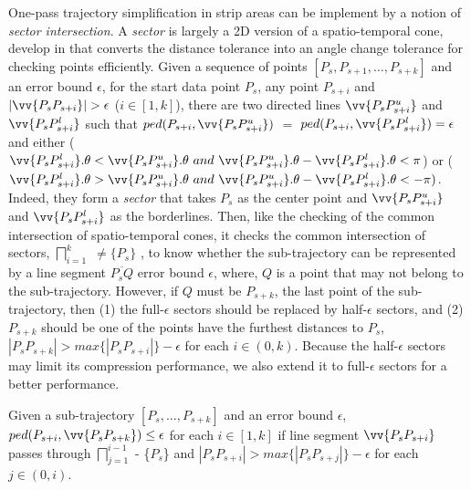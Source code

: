 One-pass trajectory simplification in strip areas can be implement by a notion of \emph{sector intersection}. A \emph{sector} is largely a 2D version of a spatio-temporal cone, develop in \cite{Williams:Longest, Sklansky:Cone, Dunham:Cone, Zhao:Sleeve} that converts the \ped distance tolerance into an angle change tolerance for checking points efficiently.
%
Given a sequence of points $[P_{s}, P_{s+1}, \ldots, P_{s+k}]$ and an error bound $\epsilon$,
for the start data point $P_s$, any point $P_{s+i}$ and $|\vv{P_sP_{s+i}}|>\epsilon$ ($i\in[1, k]$), there are two directed lines $\vv{P_sP^u_{s+i}}$ and $\vv{P_sP^l_{s+i}}$ such that $ped(P_{s+i}, \vv{P_sP^u_{s+i}})$ $=$ $ped(P_{s+i}, \vv{P_sP^l_{s+i}}) = \epsilon$ and either ($\vv{P_sP^l_{s+i}}.\theta < \vv{P_sP^u_{s+i}}.\theta ~and~\vv{P_sP^u_{s+i}}.\theta - \vv{P_sP^l_{s+i}}.\theta <\pi$) or ($\vv{P_sP^l_{s+i}}.\theta > \vv{P_sP^u_{s+i}}.\theta ~and~ \vv{P_sP^u_{s+i}}.\theta - \vv{P_sP^l_{s+i}}.\theta < -\pi)$. Indeed, they form a \emph{sector}  that takes $P_s$ as the center point and $\vv{P_sP^u_{s+i}}$ and $\vv{P_sP^l_{s+i}}$ as the borderlines.
%
Then, like the checking of the common intersection of spatio-temporal cones, it checks the common intersection of sectors, \ie $\bigsqcap_{i=1}^{k}$ $\ne \{P_s\}$ \cite{Williams:Longest, Sklansky:Cone,Zhao:Sleeve}, to know whether the sub-trajectory can be represented by a line segment $\overline{P_sQ}$ \wrt error bound $\epsilon$, where, $Q$ is a point that may not belong to the sub-trajectory. However, if $Q$ must be $P_{s+k}$, the last point of the sub-trajectory, then (1) the full-$\epsilon$ sectors should be replaced by half-$\epsilon$ sectors, and (2) $P_{s+k}$ should be one of the points have the furthest distances to $P_s$, \ie $|P_sP_{s+k}| > max\{|P_sP_{s+i}|\} - \epsilon$ for each $i \in (0, k)$. 
%
Because the half-$\epsilon$ sectors may limit its compression performance, we also extend it to full-$\epsilon$ sectors for a better performance.





\begin{proposition}
	\label{theo-full-sector}
	Given a sub-trajectory $[P_s,...,P_{s+k}]$ and an error bound $\epsilon$, $ped(P_{s+i}, \vv{P_sP_{s+k}})\le \epsilon$ for each $i \in [1,k]$ if line segment $\vv{P_sP_{s+i}}$ passes through $\bigsqcap_{j=1}^{i-1}$ - \{$P_s$\} and $|P_sP_{s+i}| > max\{|P_sP_{s+j}|\} - \epsilon$ for each $j \in (0, i)$.
\end{proposition}

